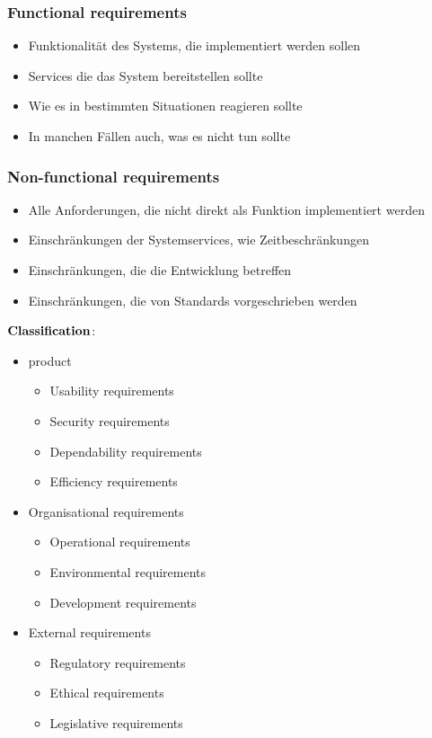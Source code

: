 \subsubsection{Functional requirements}
\begin{itemize}
	\item Funktionalität des Systems, die implementiert werden sollen
	\item Services die das System bereitstellen sollte
	\item Wie es in bestimmten Situationen reagieren sollte
	\item In manchen Fällen auch, was es nicht tun sollte
\end{itemize}
\subsubsection{Non-functional requirements}
\begin{itemize}
	\item Alle Anforderungen, die nicht direkt als Funktion implementiert werden
	\item Einschränkungen der Systemservices, wie Zeitbeschränkungen
	\item Einschränkungen, die die Entwicklung betreffen
	\item Einschränkungen, die von Standards vorgeschrieben werden 
\end{itemize}
$\bold{Classification}$:
\begin{itemize}
	\item product
		\begin{itemize}
			\item Usability requirements
			\item Security requirements
			\item Dependability requirements
			\item Efficiency requirements
		\end{itemize}
	\item Organisational requirements
		\begin{itemize}
			\item Operational requirements
			\item Environmental requirements
			\item Development requirements 
		\end{itemize}
	\item External requirements
		\begin{itemize}
			\item Regulatory requirements
			\item Ethical requirements
			\item Legislative requirements
		\end{itemize}
\end{itemize}
